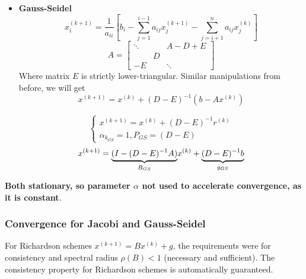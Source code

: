 \begin{itemize}
        \item \textbf{Gauss-Seidel}
        $$
        x_i^{(k+1)}=\frac{1}{a_{ii}}
        \left[
            b_i
            -\sum_{j=1}^{i-1} a_{ij}x_j^{(k+1)}
            -\sum_{j=i+1}^n a_{ij}x_j^{(k)}
        \right]
        $$
        $$
        A=\begin{bmatrix}
            \ddots & & A-D+E\\
            & D\\
            -E & & \ddots
        \end{bmatrix}
        $$
        Where matrix $E$ is strictly lower-triangular. Similar manipulations from before, we will get
        $$
        x^{(k+1)}=x^{(k)}+(D-E)^{-1}(b-Ax^{(k)})
        $$
        \begin{LARGE}
            $$
            \begin{cases}
                x^{(k+1)}=x^{(k)}+(D-E)^{-1}r^{(k)}\\
                \alpha_{k_{GS}}=1,P_{GS}=(D-E)
            \end{cases}
            $$
            $$
            x^{(k+1)}=\underlabel{(I-(D-E)^{-1}A)}{$B_{GS}$}x^{(k)}+
            \underlabel{(D-E)^{-1}b}{$g_{GS}$}
            $$
        \end{LARGE}
    \end{itemize}
    \textbf{Both stationary, so parameter $\alpha$ not used to accelerate convergence, as it is constant}.

    \subsubsection{Convergence for Jacobi and Gauss-Seidel}
    For Richardson schemes $x^{(k+1)}=Bx^{(k)}+g$, the requirements were for consistency and spectral radius $\rho(B)<1$ (necessary and sufficient). The consistency property for Richardson schemes is automatically guaranteed.

